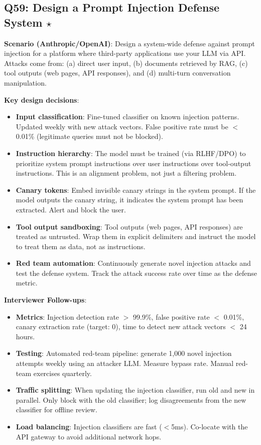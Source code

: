 \subsection{Q59: Design a Prompt Injection Defense System $\star$}

\textbf{Scenario (Anthropic/OpenAI)}: Design a system-wide defense against prompt injection for a platform where third-party applications use your LLM via API. Attacks come from: (a) direct user input, (b) documents retrieved by RAG, (c) tool outputs (web pages, API responses), and (d) multi-turn conversation manipulation.

\textbf{Key design decisions}:
\begin{itemize}[leftmargin=*]
    \item \textbf{Input classification}: Fine-tuned classifier on known injection patterns. Updated weekly with new attack vectors. False positive rate must be $<$0.01\% (legitimate queries must not be blocked).
    \item \textbf{Instruction hierarchy}: The model must be trained (via RLHF/DPO) to prioritize system prompt instructions over user instructions over tool-output instructions. This is an alignment problem, not just a filtering problem.
    \item \textbf{Canary tokens}: Embed invisible canary strings in the system prompt. If the model outputs the canary string, it indicates the system prompt has been extracted. Alert and block the user.
    \item \textbf{Tool output sandboxing}: Tool outputs (web pages, API responses) are treated as untrusted. Wrap them in explicit delimiters and instruct the model to treat them as data, not as instructions.
    \item \textbf{Red team automation}: Continuously generate novel injection attacks and test the defense system. Track the attack success rate over time as the defense metric.
\end{itemize}

\textbf{Interviewer Follow-ups}:
\begin{itemize}[leftmargin=*]
    \item \textbf{Metrics}: Injection detection rate $>$ 99.9\%, false positive rate $<$ 0.01\%, canary extraction rate (target: 0), time to detect new attack vectors $<$ 24 hours.
    \item \textbf{Testing}: Automated red-team pipeline: generate 1,000 novel injection attempts weekly using an attacker LLM. Measure bypass rate. Manual red-team exercises quarterly.
    \item \textbf{Traffic splitting}: When updating the injection classifier, run old and new in parallel. Only block with the old classifier; log disagreements from the new classifier for offline review.
    \item \textbf{Load balancing}: Injection classifiers are fast ($<$5ms). Co-locate with the API gateway to avoid additional network hops.
\end{itemize}

